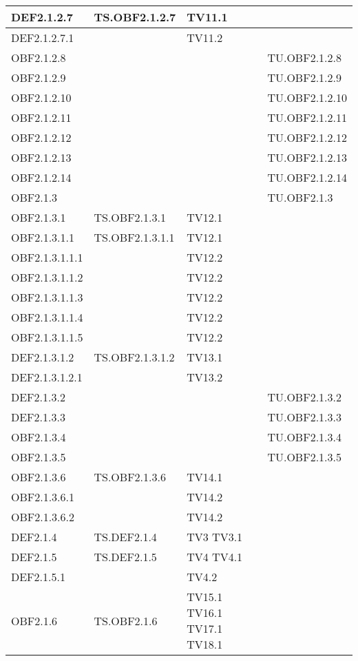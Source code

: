 \documentclass{scalatekids-article}
\begin{document}
\begin{longtable}[H]{|l|p{4cm}|p{4cm}|p{4cm}|}
  \hline
  DEF2.1.2.7 & TS.OBF2.1.2.7 & TV11.1 &\\
  \hline
  DEF2.1.2.7.1 & & TV11.2 &\\
  \hline
  OBF2.1.2.8 &  &  & TU.OBF2.1.2.8 \\
  \hline
  OBF2.1.2.9 &  &  & TU.OBF2.1.2.9 \\
  \hline
  OBF2.1.2.10 &  &  & TU.OBF2.1.2.10 \\
  \hline
  OBF2.1.2.11 &  &  & TU.OBF2.1.2.11 \\
  \hline
  OBF2.1.2.12 &  &  & TU.OBF2.1.2.12 \\
  \hline
  OBF2.1.2.13 &  &  & TU.OBF2.1.2.13 \\
  \hline
  OBF2.1.2.14 &  &  & TU.OBF2.1.2.14 \\
  \hline
  OBF2.1.3 &  &  & TU.OBF2.1.3 \\
  \hline
  OBF2.1.3.1 & TS.OBF2.1.3.1 & TV12.1 &\\
  \hline
  OBF2.1.3.1.1 & TS.OBF2.1.3.1.1 & TV12.1 &\\
  \hline
  OBF2.1.3.1.1.1 & & TV12.2 &\\
  \hline
  OBF2.1.3.1.1.2 & & TV12.2 &\\
  \hline
  OBF2.1.3.1.1.3 & & TV12.2 &\\
  \hline
  OBF2.1.3.1.1.4 & & TV12.2 &\\
  \hline
  OBF2.1.3.1.1.5 & & TV12.2 &\\
  \hline
  DEF2.1.3.1.2 & TS.OBF2.1.3.1.2 & TV13.1 &\\
  \hline
  DEF2.1.3.1.2.1 & & TV13.2 &\\
  \hline
  DEF2.1.3.2 & &  & TU.OBF2.1.3.2 \\ %
  \hline
  DEF2.1.3.3 & &  & TU.OBF2.1.3.3 \\ %
  \hline
  OBF2.1.3.4 & &  & TU.OBF2.1.3.4 \\ %
  \hline
  OBF2.1.3.5 & & & TU.OBF2.1.3.5 \\ %
  \hline
  OBF2.1.3.6 & TS.OBF2.1.3.6 & TV14.1 &\\
  \hline
  OBF2.1.3.6.1 & & TV14.2 &\\
  \hline
  OBF2.1.3.6.2 & & TV14.2 &\\
  \hline
  DEF2.1.4 & TS.DEF2.1.4 & TV3 TV3.1 &\\
  \hline
  DEF2.1.5 & TS.DEF2.1.5 & TV4 TV4.1 &\\
  \hline
  DEF2.1.5.1 & & TV4.2 &\\
  \hline
  OBF2.1.6 & TS.OBF2.1.6 & TV15.1 TV16.1 TV17.1 TV18.1 &\\

\end{longtable}
\end{document}
